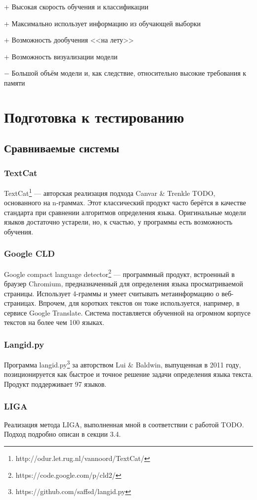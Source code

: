 \documentclass[a4paper, 14pt]{article}
\begin{document}
		$+$ Высокая скорость обучения и классификации
		
		$+$ Максимально использует информацию из обучающей выборки
		
		$+$ Возможность дообучения <<на лету>>
		
		$+$ Возможность визуализации модели
		
		$-$ Большой объём модели и, как следствие, относительно высокие требования к памяти
			
\section{Подготовка к тестированию}
		\subsection{Сравниваемые системы}
			\subsubsection{TextCat}
			TextCat\footnote{http://odur.let.rug.nl/vannoord/TextCat/} --- авторская реализация подхода Canvar \& Trenkle TODO, основанного на n-граммах.
			Этот классический продукт часто берётся в качестве стандарта при сравнении алгоритмов определения языка. 
			Оригинальные модели языков достаточно устарели, но, к счастью, у программы есть возможность обучения.
			\subsubsection{Google CLD}
			Google compact language detector\footnote{https://code.google.com/p/cld2/} --- программный продукт, встроенный в браузер Chromium, 
			предназначенный для определения языка просматриваемой страницы. 
			Использует 4-граммы и умеет считывать метаинформацию
			о веб-страницах. Впрочем, для коротких текстов он тоже используется, например, в сервисе Google Translate. Система поставляется обученной
			на огромном корпусе текстов на более чем 100 языках.
			\subsubsection{Langid.py}
			Программа langid.py\footnote{https://github.com/saffsd/langid.py} за авторством Lui \& Baldwin, выпущенная в 2011 году, позиционируется
			как быстрое и точное решение задачи определения языка текста. Продукт поддерживает 97 языков.
			\subsubsection{LIGA}
			Реализация метода LIGA, выполненная мной в соответствии с работой TODO. Подход подробно описан в секции 3.4.
\end{document}
